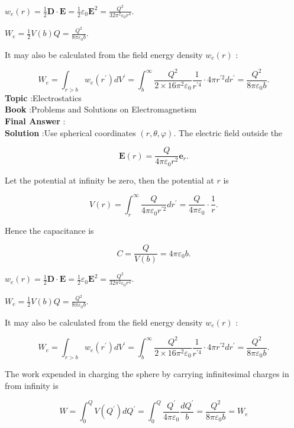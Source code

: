 \documentclass[10pt]{article}
\begin{document}
 $w_{e}(r)=\frac{1}{2} \mathbf{D} \cdot \mathbf{E}=\frac{1}{2} \varepsilon_{0} \mathbf{E}^{2}=\frac{Q^{2}}{32 \pi^{2} \varepsilon_{0} r^{4}}$.

 $W_{e}=\frac{1}{2} V(b) Q=\frac{Q^{2}}{8 \pi \varepsilon_{0} b}$.

It may also be calculated from the field energy density $w_{e}(r)$ :

$$
W_{e}=\int_{r>b} w_{e}\left(r^{\prime}\right) d V^{\prime}=\int_{b}^{\infty} \frac{Q^{2}}{2 \times 16 \pi^{2} \varepsilon_{0}} \frac{1}{r^{\prime 4}} \cdot 4 \pi r^{\prime 2} d r^{\prime}=\frac{Q^{2}}{8 \pi \varepsilon_{0} b} .
$$
\textbf{Topic} :Electrostatics\\
\textbf{Book} :Problems and Solutions on Electromagnetism\\
\textbf{Final Answer} :\\


\textbf{Solution} :Use spherical coordinates $(r, \theta, \varphi)$. The electric field outside the

$$
\mathbf{E}(r)=\frac{Q}{4 \pi \varepsilon_{0} r^{2}} \mathbf{e}_{r} .
$$

Let the potential at infinity be zero, then the potential at $r$ is

$$
V(r)=\int_{r}^{\infty} \frac{Q}{4 \pi \varepsilon_{0} r^{\prime 2}} d r^{\prime}=\frac{Q}{4 \pi \varepsilon_{0}} \cdot \frac{1}{r} .
$$



Hence the capacitance is

$$
C=\frac{Q}{V(b)}=4 \pi \varepsilon_{0} b .
$$

 $w_{e}(r)=\frac{1}{2} \mathbf{D} \cdot \mathbf{E}=\frac{1}{2} \varepsilon_{0} \mathbf{E}^{2}=\frac{Q^{2}}{32 \pi^{2} \varepsilon_{0} r^{4}}$.

 $W_{e}=\frac{1}{2} V(b) Q=\frac{Q^{2}}{8 \pi \varepsilon_{0} b}$.

It may also be calculated from the field energy density $w_{e}(r)$ :

$$
W_{e}=\int_{r>b} w_{e}\left(r^{\prime}\right) d V^{\prime}=\int_{b}^{\infty} \frac{Q^{2}}{2 \times 16 \pi^{2} \varepsilon_{0}} \frac{1}{r^{\prime 4}} \cdot 4 \pi r^{\prime 2} d r^{\prime}=\frac{Q^{2}}{8 \pi \varepsilon_{0} b} .
$$

 The work expended in charging the sphere by carrying infinitesimal charges in from infinity is

$$
W=\int_{0}^{Q} V\left(Q^{\prime}\right) d Q^{\prime}=\int_{0}^{Q} \frac{Q^{\prime}}{4 \pi \varepsilon_{0}} \frac{d Q^{\prime}}{b}=\frac{Q^{2}}{8 \pi \varepsilon_{0} b}=W_{e}
$$
\end{document}
